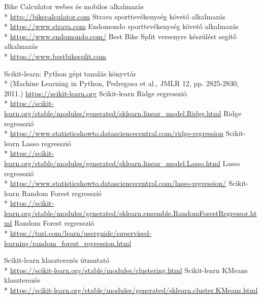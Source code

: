 \begin{thebibliography}{x}

 Bike Calculator webes és mobilos alkalmazás\\* \url{http://bikecalculator.com}
 Strava sporttevékenység követő alkalmazás\\*
\url{https://www.strava.com}
 Endomondo sporttevékenység követő alkalmazás\\*
\url{https://www.endomondo.com/}
 Best Bike Split versenyre készülést segítő alkalmazás\\*
\url{https://www.bestbikesplit.com}

 Scikit-learn: Python gépi tanulás könyvtár\\*
(Machine Learning in Python, Pedregosa et al., JMLR 12, pp. 2825-2830, 2011.) \url{https://scikit-learn.org}
 Scikit-learn Ridge regresszió\\* \url{https://scikit-learn.org/stable/modules/generated/sklearn.linear\_model.Ridge.html}
 Ridge regresszió \\* \url{https://www.statisticshowto.datasciencecentral.com/ridge-regression}
 Scikit-learn Lasso regresszió\\* \url{https://scikit-learn.org/stable/modules/generated/sklearn.linear\_model.Lasso.html}
 Lasso regresszió\\* \url{https://www.statisticshowto.datasciencecentral.com/lasso-regression/}
	Scikit-learn Random Forest regresszió\\*
\url{https://scikit-learn.org/stable/modules/generated/sklearn.ensemble.RandomForestRegressor.html}
 Random Forest regresszió\\*
\url{https://turi.com/learn/userguide/supervised-learning/random\_forest\_regression.html}

 Scikit-learn klaszterezés útmutató\\*
\url{https://scikit-learn.org/stable/modules/clustering.html}
 Scikit-learn KMeans klaszterezés\\*
\url{https://scikit-learn.org/stable/modules/generated/sklearn.cluster.KMeans.html}


\end{thebibliography}
